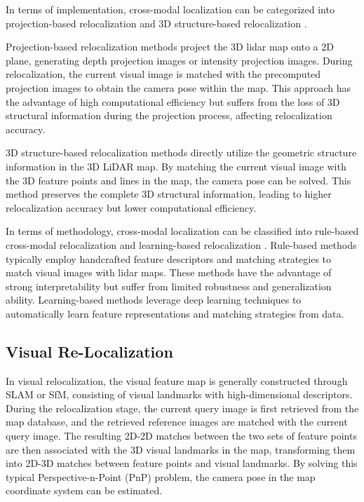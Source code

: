 \documentclass[conference]{./support/ieeeconf}
\begin{document}
In terms of implementation, cross-modal localization can be categorized into projection-based relocalization \cite{chen2022i2d,pan2024qtcross} and 3D structure-based relocalization \cite{huang2019metric,kimstereo}.

Projection-based relocalization methods project the 3D lidar map onto a 2D plane, generating depth projection images or intensity projection images. During relocalization, the current visual image is matched with the precomputed projection images to obtain the camera pose within the map.
This approach has the advantage of high computational efficiency but suffers from the loss of 3D structural information during the projection process, affecting relocalization accuracy.

3D structure-based relocalization methods directly utilize the geometric structure information in the 3D LiDAR map.
By matching the current visual image with the 3D feature points and lines in the map, the camera pose can be solved.
This method preserves the complete 3D structural information, leading to higher relocalization accuracy but lower computational efficiency.

In terms of methodology, cross-modal localization can be classified into rule-based cross-modal relocalization \cite{he2024accurate} and learning-based relocalization \cite{wang2021p2net,cattaneo2020global}.
Rule-based methods typically employ handcrafted feature descriptors and matching strategies to match visual images with lidar maps.
These methods have the advantage of strong interpretability but suffer from limited robustness and generalization ability.
Learning-based methods leverage deep learning techniques to automatically learn feature representations and matching strategies from data.



\subsection{Visual Re-Localization} 
In visual relocalization, the visual feature map is generally constructed through SLAM or SfM, consisting of visual landmarks with high-dimensional descriptors. During the relocalization stage, the current query image is first retrieved from the map database, and the retrieved reference images are matched with the current query image. The resulting 2D-2D matches between the two sets of feature points are then associated with the 3D visual landmarks in the map, transforming them into 2D-3D matches between feature points and visual landmarks. By solving this typical Perspective-n-Point (PnP) problem, the camera pose in the map coordinate system can be estimated.\cite{carmichael2024spot}
\end{document}
